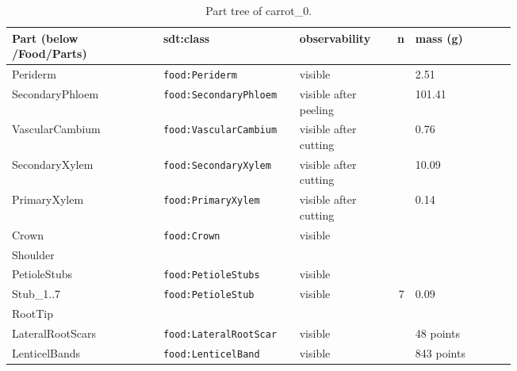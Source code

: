 \documentclass[10.5pt,a4paper]{article}
\begin{document}
\begin{table}[htbp]\centering\scriptsize\caption{Part tree of carrot\_0.}
\begin{tabularx}{\linewidth}{@{}p{0.30\linewidth}p{0.27\linewidth}p{0.17\linewidth}rX@{}}\toprule Part (below /Food/Parts) & sdt:class & observability & n & mass (g) \\\midrule
\hspace*{0.0em}Periderm & \texttt{food:Periderm} & visible &  & 2.51 \\
\hspace*{0.0em}SecondaryPhloem & \texttt{food:SecondaryPhloem} & visible after peeling &  & 101.41 \\
\hspace*{0.0em}VascularCambium & \texttt{food:VascularCambium} & visible after cutting &  & 0.76 \\
\hspace*{0.0em}SecondaryXylem & \texttt{food:SecondaryXylem} & visible after cutting &  & 10.09 \\
\hspace*{0.0em}PrimaryXylem & \texttt{food:PrimaryXylem} & visible after cutting &  & 0.14 \\
\hspace*{0.0em}Crown & \texttt{food:Crown} & visible &  &  \\
\hspace*{0.9em}Shoulder &  &  &  &  \\
\hspace*{0.9em}PetioleStubs & \texttt{food:PetioleStubs} & visible &  &  \\
\hspace*{1.8em}Stub\_1..7 & \texttt{food:PetioleStub} & visible & 7 & 0.09 \\
\hspace*{0.0em}RootTip &  &  &  &  \\
\hspace*{0.0em}LateralRootScars & \texttt{food:LateralRootScar} & visible &  & 48 points \\
\hspace*{0.0em}LenticelBands & \texttt{food:LenticelBand} & visible &  & 843 points \\\bottomrule\end{tabularx}\end{table}
\end{document}
